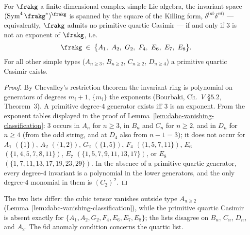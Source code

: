 \begin{lemma}
\label{lem:quartic-casimir-classification}
For $\frakg$ a finite-dimensional complex simple Lie algebra, the
invariant space $(\operatorname{Sym}^4 \frakg^*)^\frakg$ is spanned
by the square of the Killing form,
$\delta^{(ab}\delta^{cd)}$ --- equivalently, $\frakg$ admits no
primitive quartic Casimir --- if and only if $3$ is not an exponent
of $\frakg$, i.e.
\[
 \frakg \;\in\; \bigl\{ A_1,\ A_2,\ G_2,\ F_4,\ E_6,\ E_7,\ E_8 \bigr\}.
\]
For all other simple types ($A_{n \geq 3}$, $B_{n \geq 2}$,
$C_{n \geq 2}$, $D_{n \geq 4}$) a primitive quartic Casimir exists.
\end{lemma}

\begin{proof}
By Chevalley's restriction theorem the invariant ring is polynomial
on generators of degrees $m_i + 1$, $\{m_i\}$ the exponents
(Bourbaki, Ch.~$V$ \S$5.2$, Theorem~$3$). A primitive degree-$4$
generator exists iff $3$ is an exponent. From the exponent tables
displayed in the proof of
Lemma~\ref{lem:dabc-vanishing-classification}: $3$ occurs in $A_n$
for $n \geq 3$, in $B_n$ and $C_n$ for $n \geq 2$, and in $D_n$ for
$n \geq 4$ (from the odd string, and at $D_4$ also from
$n - 1 = 3$); it does not occur for $A_1$ $(\{1\})$, $A_2$
$(\{1,2\})$, $G_2$ $(\{1,5\})$, $F_4$ $(\{1,5,7,11\})$, $E_6$
$(\{1,4,5,7,8,11\})$, $E_7$ $(\{1,5,7,9,11,13,17\})$, or $E_8$
$(\{1,7,11,13,17,19,23,29\})$. In the absence of a primitive quartic
generator, every degree-$4$ invariant is a polynomial in the lower
generators, and the only degree-$4$ monomial in them is $(C_2)^2$.
\end{proof}

The two lists differ: the cubic tensor vanishes outside type
$A_{n \geq 2}$ (Lemma~\ref{lem:dabc-vanishing-classification}), while
the primitive quartic Casimir is absent exactly for
$\{A_1, A_2, G_2, F_4, E_6, E_7, E_8\}$; the lists disagree on
$B_n$, $C_n$, $D_n$, and $A_2$. The $6$d anomaly condition concerns
the quartic list.

